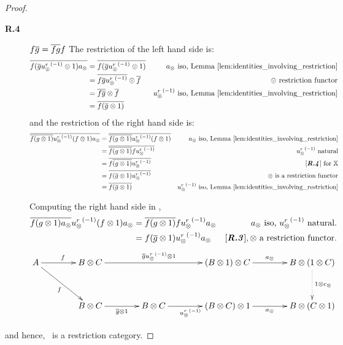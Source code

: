 \begin{proof}
\begin{description}
    \item[\textbf{R.4}] $f \overline{g} = \overline{f g} f$ The restriction of the left hand side is:
      \begin{align*}
        \overline{f (\overline{g} {u_{\otimes}^r}^{(-1)}\otimes 1) a_{\otimes}}
          & = \overline{f (\overline{g} {u_{\otimes}^r}^{(-1)}\otimes 1)} & a_{\otimes} 
          \text{ iso, Lemma \ref{lem:identities_involving_restriction}} \\
        & = \overline{f \overline{g} {u_{\otimes}^r}^{(-1)}} \otimes \overline{f} & \otimes \text{ restriction functor}\\
        & = \overline{f \overline{g}} \otimes \overline{f} & {u_{\otimes}^r}^{(-1)} 
          \text{ iso, Lemma \ref{lem:identities_involving_restriction}} \\
        & = \overline{f (\overline{g} \otimes 1)}
      \end{align*}
      and the restriction of the right hand side is:
      \begin{align*}
        \rst{\rst{f (g \* 1)} \inv{\usr} (f\* 1) a_{\*}}
          & = \rst{\rst{f (g \* 1)} \inv{\usr} (f\* 1) } & a_{\*} 
          \text{ iso, Lemma \ref{lem:identities_involving_restriction}}\\
        & = \rst{\rst{f (g \* 1)} f \inv{\usr}  } & \inv{\usr} \text{ natural}\\
        & = \rst{f \rst{(g \* 1)}  \inv{\usr}  } & \text{ \rfour for }\X\\
        & = \rst{f (\rst{g} \* 1)  \inv{\usr}  } & \* \text{ is a restriction functor}\\
        & = \rst{f (\rst{g} \* 1)    } & \inv{\usr} 
          \text{ iso, Lemma \ref{lem:identities_involving_restriction}}
      \end{align*}

      Computing the right hand side in \X,
      \begin{align*}
        \overline{f(g\otimes 1)a_{\otimes}} {u_{\otimes}^r}^{(-1)} (f\otimes 1) a_{\otimes}
          & = \overline{f(g\otimes 1)} f {u_{\otimes}^r}^{(-1)} a_{\otimes} & a_{\otimes} \text{ iso, } {\ensuremath{u_{\otimes}^r}}^{(-1)}\text{ natural.}\\
        & = f (\overline{g} \otimes 1) {u_{\otimes}^r}^{(-1)} a_{\otimes} & [\text{\emph{\bfseries {R}.{3}}}], \otimes \text{ a restriction functor.}
      \end{align*}
      \[
        \xymatrix @C=40pt @R=35pt{
          A \ar[r]^f \ar[dr]_{f}
            & B\* C \ar[rr]^{\restr{g} \inv{\usr}\* 1}
            &
            & (B\* 1) \* C \ar[r]^{a_{\*}}
            & B \* (1 \* C)\ar@{.>}[d]^{1\*c_{\*}}\\
          & B\*C \ar[r]_{\rst{g}\*1}
            & B \* C \ar[r]_{\inv{\usr}}
            & (B \* C) \* 1 \ar[r]_{a_{\*}}
            & B \* (C\*1)
        }
      \]
  \end{description}

  and hence, \Xt\ is a restriction category.
\end{proof}
